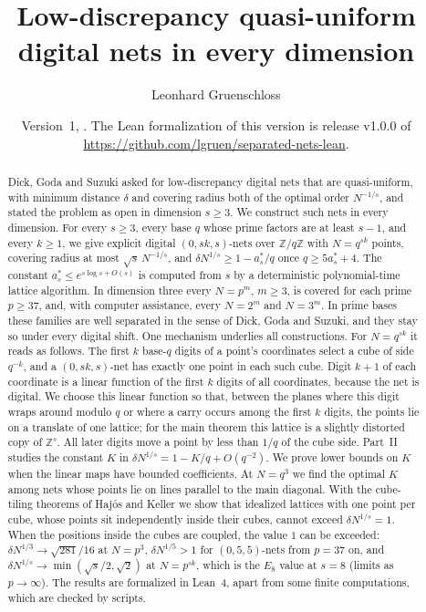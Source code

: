 \documentclass[11pt]{amsart}
\title[Quasi-uniform digital nets in every dimension]{Low-discrepancy quasi-uniform digital nets in every dimension}
\author{Leonhard Gruenschloss}
\date{Version~1, \VersionDate. The Lean formalization of this version is release v1.0.0 of \url{https://github.com/lgruen/separated-nets-lean}.}
\theoremstyle{definition}
\theoremstyle{plain}
\newcommand{\Z}{\mathbb{Z}}
\begin{document}
\begin{abstract}
Dick, Goda and Suzuki asked for low-discrepancy digital nets that are quasi-uniform, with minimum distance $\delta$ and covering radius both of the optimal order $N^{-1/s}$, and stated the problem as open in dimension $s\ge3$. We construct such nets in every dimension. For every $s\ge3$, every base $q$ whose prime factors are at least $s-1$, and every $k\ge1$, we give explicit digital $(0,sk,s)$-nets over $\Z/q\Z$ with $N=q^{sk}$ points, covering radius at most $\sqrt s\,N^{-1/s}$, and $\delta N^{1/s}\ge1-a^*_s/q$ once $q\ge5a^*_s+4$. The constant $a^*_s\le e^{s\log s+O(s)}$ is computed from $s$ by a deterministic polynomial-time lattice algorithm. In dimension three every $N=p^m$, $m\ge3$, is covered for each prime $p\ge37$, and, with computer assistance, every $N=2^m$ and $N=3^m$. In prime bases these families are well separated in the sense of Dick, Goda and Suzuki, and they stay so under every digital shift.
One mechanism underlies all constructions. For $N=q^{sk}$ it reads as follows. The first $k$ base-$q$ digits of a point's coordinates select a cube of side $q^{-k}$, and a $(0,sk,s)$-net has exactly one point in each such cube. Digit $k+1$ of each coordinate is a linear function of the first $k$ digits of all coordinates, because the net is digital. We choose this linear function so that, between the planes where this digit wraps around modulo $q$ or where a carry occurs among the first $k$ digits, the points lie on a translate of one lattice; for the main theorem this lattice is a slightly distorted copy of $\Z^s$. All later digits move a point by less than $1/q$ of the cube side. Part~II studies the constant $K$ in $\delta N^{1/s}=1-K/q+O(q^{-2})$. We prove lower bounds on $K$ when the linear maps have bounded coefficients. At $N=q^3$ we find the optimal $K$ among nets whose points lie on lines parallel to the main diagonal. With the cube-tiling theorems of Haj\'os and Keller we show that idealized lattices with one point per cube, whose points sit independently inside their cubes, cannot exceed $\delta N^{1/s}=1$. When the positions inside the cubes are coupled, the value $1$ can be exceeded: $\delta N^{1/3}\to\sqrt{281}/16$ at $N=p^3$, $\delta N^{1/5}>1$ for $(0,5,5)$-nets from $p=37$ on, and $\delta N^{1/s}\to\min(\sqrt s/2,\sqrt2)$ at $N=p^{sk}$, which is the $E_8$ value at $s=8$ (limits as $p\to\infty$). The results are formalized in Lean~4, apart from some finite computations, which are checked by scripts.
\end{abstract}
\end{document}
